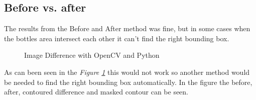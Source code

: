 \subsection{Before vs. after}
The results from the Before and After method was fine, but in some cases when the bottles area intersect each other it can't find the right bounding box. 
\begin{figure}[ht]
    \centering
    \hfill
    \hfill
    \hfill
    \caption{Image Difference with OpenCV and Python}
    \label{figure: imagework}
\end{figure}

As can been seen in the \textit{Figure \ref{figure: imagework}} this would not work so another method would be needed to find the right bounding box automatically. In the figure the before, after, contoured difference and masked contour can be seen. 


